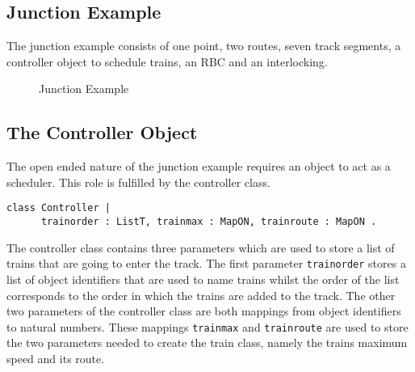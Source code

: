 \subsection*{Junction Example}
The junction example consists of one point, two routes, seven track segments, a controller object to schedule trains, an RBC and an interlocking.

\begin{figure}[h!]
\begin{center}
\end{center} 
\caption{Junction Example}
\label{fig:junctionexample}
\end{figure}

\subsection*{The Controller Object}
The open ended nature of the junction example requires an object to act as a scheduler. This role is fulfilled by the controller class. 

\begin{lstlisting}[caption = "Controller Class"]
class Controller | 
      trainorder : ListT, trainmax : MapON, trainroute : MapON .
\end{lstlisting}

The controller class contains three parameters which are used to store a list of trains that are going to enter the track. The first parameter \texttt{trainorder} stores a list of object identifiers that are used to name trains whilst the order of the list corresponds to the order in which the trains are added to the track. The other two parameters of the controller class are both mappings from object identifiers to natural numbers. These mappings \texttt{trainmax} and \texttt{trainroute} are used to store the two parameters needed to create the train class, namely the trains maximum speed and its route.

